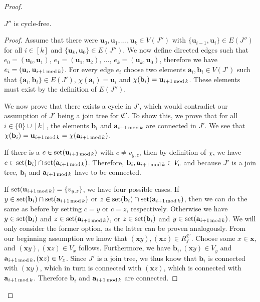 \begin{proof}
	\begin{claim}
		$J''$ is cycle-free.
	\end{claim}
	\begin{proof}
		Assume that there were $\mathbf u_0,\mathbf u_1,\dots,\mathbf u_k\in V(J'')$ with $\{\mathbf u_{i-1},\mathbf u_i\}\in E(J'')$ for all $i\in [k]$ and $\{\mathbf u_k,\mathbf u_0\}\in E(J'')$.
		We now define directed edges such that $e_0=(\mathbf u_0,\mathbf u_1)$, $e_1=(\mathbf u_1,\mathbf u_2)$, $\dots$, $e_k=(\mathbf u_k,\mathbf u_0)$, therefore we have $e_i=(\mathbf u_i, \mathbf u_{i+1\operatorname{mod} k})$.
		For every edge $e_i$ choose two elements $\mathbf a_i,\mathbf b_i\in V(J')$ such that $\{\mathbf a_i,\mathbf b_i\}\in E(J')$, $\chi(\mathbf a_i)=\mathbf u_i$ and $\chi(\mathbf b_i)=\mathbf u_{i+1\operatorname{mod} k}$.
		These elements must exist by the definition of $E(J'')$.
		
		We now prove that there exists a cycle in $J'$, which would contradict our assumption of $J'$ being a join tree for $\mathfrak C'$.
		To show this, we prove that for all $i\in\{0\}\cup[k]$, the elements $\mathbf b_i$ and $\mathbf a_{i+1\operatorname{mod} k}$ are connected in $J'$.
		We see that $\chi(\mathbf b_i)=\mathbf u_{i+1\operatorname{mod} k} = \chi(\mathbf a_{i+1\operatorname{mod} k})$.
		
		If there is a $c\in \operatorname{set}(\mathbf u_{i+1\operatorname{mod} k})$ with $c\neq v_{y,z}$, then by definition of $\chi$, we have $c\in \operatorname{set}(\mathbf b_i)\cap \operatorname{set}(\mathbf a_{i+1\operatorname{mod} k})$.
		Therefore, $\mathbf b_i,\mathbf a_{i+1\operatorname{mod} k}\in V_c$ and because $J'$ is a join tree, $\mathbf b_i$ and $\mathbf a_{i+1\operatorname{mod} k}$ have to be connected.
		
		If $\operatorname{set}(\mathbf u_{i+1\operatorname{mod} k})=\{v_{y,z}\}$, we have four possible cases.
		If $y\in \operatorname{set}(\mathbf b_i)\cap \operatorname{set}(\mathbf a_{i+1\operatorname{mod} k})$ or $z\in \operatorname{set}(\mathbf b_i)\cap \operatorname{set}(\mathbf a_{i+1\operatorname{mod} k})$, then we can do the same as before by setting $c=y$ or $c=z$, respectively.
		Otherwise we have $y\in\operatorname{set}(\mathbf b_i)$ and $z\in \operatorname{set}(\mathbf a_{i+1\operatorname{mod} k})$, or $z\in\operatorname{set}(\mathbf b_i)$ and $y\in \operatorname{set}(\mathbf a_{i+1\operatorname{mod} k})$.
		We will only consider the former option, as the latter can be proven analogously.
		From our beginning assumption we know that $(\mathbf xy),(\mathbf xz)\in R_f^{\mathfrak C'}$. Choose some $x\in\mathbf x$, and $(\mathbf xy),(\mathbf xz)\in V_x$ follows.
		Furthermore, we have $\mathbf b_i,(\mathbf xy)\in V_y$ and $\mathbf a_{i+1\operatorname{mod} k},(\mathbf xz)\in V_z$.
		Since $J'$ is a join tree, we thus know that $\mathbf b_i$ is connected with $(\mathbf xy)$, which in turn is connected with $(\mathbf xz)$, which is connected with $\mathbf a_{i+1\operatorname{mod} k}$.
		Therefore $\mathbf b_i$ and $\mathbf a_{i+1\operatorname{mod} k}$ are connected.
		

\end{proof}
\end{proof}
